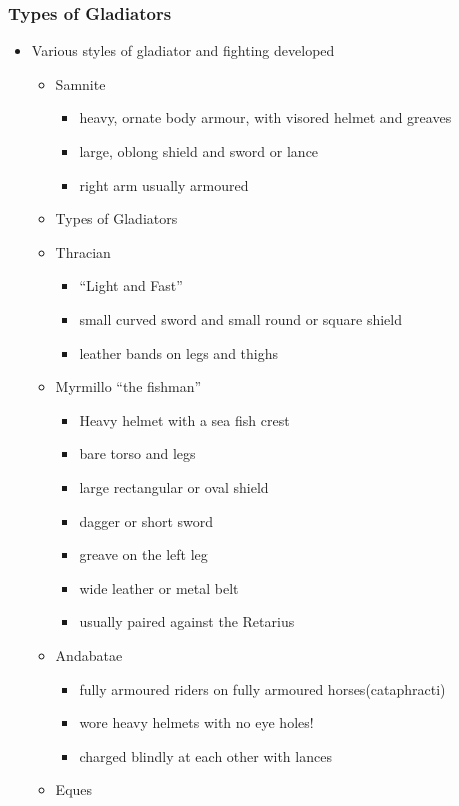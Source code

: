 \documentclass[12pt, twoside]{article}
\begin{document}
\subsubsection{Types of Gladiators}
\begin{itemize}
\item Various styles of gladiator and fighting developed
	\begin{itemize}
	\item Samnite
		\begin{itemize}
		\item heavy, ornate body armour, with visored helmet and greaves
		\item large, oblong shield and sword or lance
		\item right arm usually armoured
		\end{itemize}
	\item Types of Gladiators
	\item Thracian
		\begin{itemize}
		\item “Light and Fast”
		\item small curved sword and small round or square shield
		\item leather bands on legs and thighs
		\end{itemize}
	\item Myrmillo “the fishman”
		\begin{itemize}
		\item Heavy helmet with a sea fish crest
		\item bare torso and legs
		\item large rectangular or oval shield
		\item dagger or short sword
		\item greave on the left leg
		\item wide leather or metal belt
		\item usually paired against the Retarius
		\end{itemize}
	\item Andabatae
		\begin{itemize}
		\item fully armoured riders on fully armoured horses(cataphracti)
		\item wore heavy helmets with no eye holes!
		\item charged blindly at each other with lances
		\end{itemize}
	\item Eques
		\begin{itemize}

\end{itemize}
\end{itemize}
\end{itemize}
\end{document}

